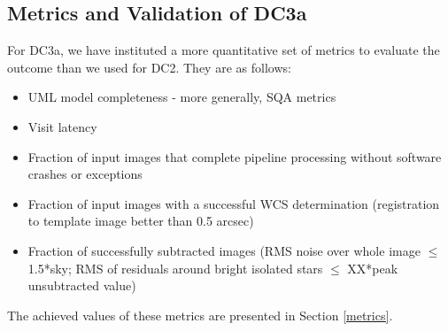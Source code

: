\subsection{Metrics and Validation of DC3a}

For DC3a, we have instituted a more quantitative set of metrics to
evaluate the outcome than we used for DC2.  They are as follows:

\begin{itemize}
\item UML model completeness - more generally, SQA metrics
\item Visit latency
\item Fraction of input images that complete pipeline processing
  without software crashes or exceptions
\item Fraction of input images with a successful WCS determination
  (registration to template image better than 0.5 arcsec)
\item Fraction of successfully subtracted images (RMS noise over whole
  image $\leq$ 1.5*sky; RMS of residuals around bright isolated stars
  $\leq$ XX*peak unsubtracted value)
\end{itemize}

The achieved values of these metrics are presented in Section \ref{metrics}.

